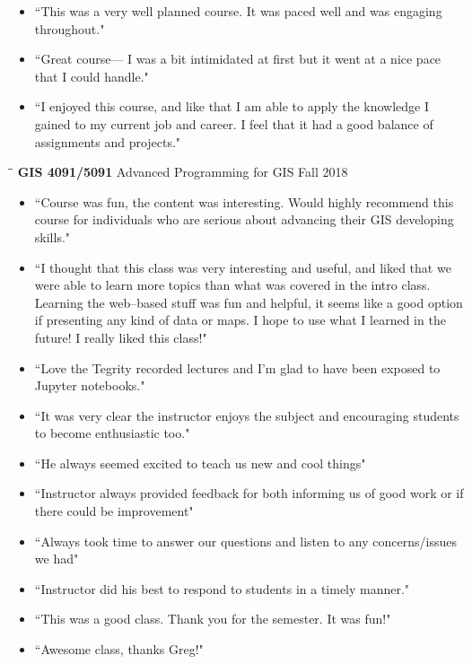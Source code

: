 \documentclass{res}
\begin{document}
\begin{resume}
\begin{itemize}
\item``This was a very well planned course. It was paced well and was engaging throughout."
\item``Great course–– I was a bit intimidated at first but it went at a nice pace that I could handle."
\item``I enjoyed this course, and like that I am able to apply the knowledge I gained to my current job and career. I feel that it had a good balance of assignments and projects."
\end{itemize}
\begin{tabbing}
	\hspace{2.3in}\= \hspace{2.6in}\= \kill %
	{\bf GIS 4091/5091} \>Advanced Programming for GIS     \>Fall 2018\\
	\>
\end{tabbing}\vspace{-20pt}      %
\begin{itemize}  
\item ``Course was fun, the content was interesting. Would highly recommend this course for individuals who are serious about advancing their GIS developing skills."
\item ``I thought that this class was very interesting and useful, and liked that we were able to learn more topics than what was covered in the intro class. Learning the web–based stuff was fun and helpful, it seems like a good option if presenting any kind of data or maps. I hope to use what I learned in the future! I really liked this class!"
\item ``Love the Tegrity recorded lectures and I'm glad to have been exposed to Jupyter notebooks."
\item ``It was very clear the instructor enjoys the subject and encouraging students to become enthusiastic too."
\item ``He always seemed excited to teach us new and cool things"
\item ``Instructor always provided feedback for both informing us of good work or if there could be improvement"
\item ``Always took time to answer our questions and listen to any concerns/issues we had"
\item ``Instructor did his best to respond to students in a timely manner."
\item ``This was a good class. Thank you for the semester. It was fun!"
\item ``Awesome class, thanks Greg!"
\end{itemize}
\end{resume}


\end{document}
